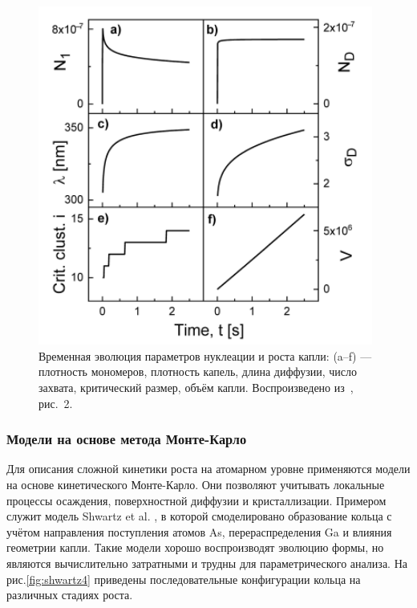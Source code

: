 \documentclass[14pt,oneside]{extarticle}
\begin{document}
\begin{figure}[H]
    \begin{center}
        \includegraphics[width=11cm]{images/dubrovskii_fig2.png}
        \caption{\label{fig:dubrovskii_model}
            Временная эволюция параметров нуклеации и роста капли: (a--f) — плотность мономеров, плотность капель, длина диффузии, число захвата, критический размер, объём капли. Воспроизведено из~\cite{dubrovskii2021}, рис.~2.}
    \end{center}
\end{figure}

\subsubsection*{Модели на основе метода Монте-Карло}
Для описания сложной кинетики роста на атомарном уровне применяются модели на основе кинетического Монте-Карло. Они позволяют учитывать локальные процессы осаждения, поверхностной диффузии и кристаллизации. Примером служит модель Shwartz et al. \cite{shwartz2018}, в которой смоделировано образование кольца с учётом направления поступления атомов As, перераспределения Ga и влияния геометрии капли. Такие модели хорошо воспроизводят эволюцию формы, но являются вычислительно затратными и трудны для параметрического анализа. На рис.\ref{fig:shwartz4} приведены последовательные конфигурации кольца на различных стадиях роста.
\end{document}

